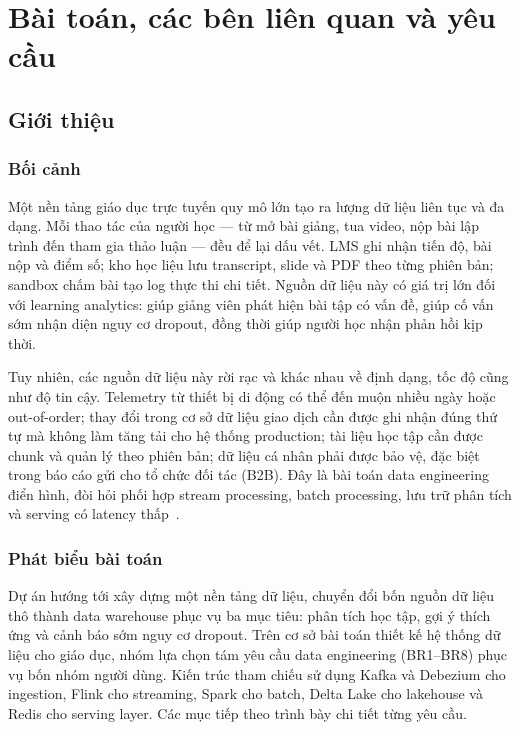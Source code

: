 \chapter{Bài toán, các bên liên quan và yêu cầu}
\label{chap:requirements}

\section{Giới thiệu}

\subsection{Bối cảnh}

Một nền tảng giáo dục trực tuyến quy mô lớn tạo ra lượng dữ liệu liên tục và đa dạng. Mỗi thao tác của người học --- từ mở bài giảng, tua video, nộp bài lập trình đến tham gia thảo luận --- đều để lại dấu vết. LMS ghi nhận tiến độ, bài nộp và điểm số; kho học liệu lưu transcript, slide và PDF theo từng phiên bản; sandbox chấm bài tạo log thực thi chi tiết. Nguồn dữ liệu này có giá trị lớn đối với learning analytics: giúp giảng viên phát hiện bài tập có vấn đề, giúp cố vấn sớm nhận diện nguy cơ dropout, đồng thời giúp người học nhận phản hồi kịp thời.

Tuy nhiên, các nguồn dữ liệu này rời rạc và khác nhau về định dạng, tốc độ cũng như độ tin cậy. Telemetry từ thiết bị di động có thể đến muộn nhiều ngày hoặc out-of-order; thay đổi trong cơ sở dữ liệu giao dịch cần được ghi nhận đúng thứ tự mà không làm tăng tải cho hệ thống production; tài liệu học tập cần được chunk và quản lý theo phiên bản; dữ liệu cá nhân phải được bảo vệ, đặc biệt trong báo cáo gửi cho tổ chức đối tác (B2B). Đây là bài toán data engineering điển hình, đòi hỏi phối hợp stream processing, batch processing, lưu trữ phân tích và serving có latency thấp~\cite{kleppmann2017}.

\subsection{Phát biểu bài toán}

Dự án hướng tới xây dựng một nền tảng dữ liệu, chuyển đổi bốn nguồn dữ liệu thô thành data warehouse phục vụ ba mục tiêu: phân tích học tập, gợi ý thích ứng và cảnh báo sớm nguy cơ dropout. Trên cơ sở bài toán thiết kế hệ thống dữ liệu cho giáo dục, nhóm lựa chọn tám yêu cầu data engineering (BR1--BR8) phục vụ bốn nhóm người dùng. Kiến trúc tham chiếu sử dụng Kafka và Debezium cho ingestion, Flink cho streaming, Spark cho batch, Delta Lake cho lakehouse và Redis cho serving layer. Các mục tiếp theo trình bày chi tiết từng yêu cầu.

